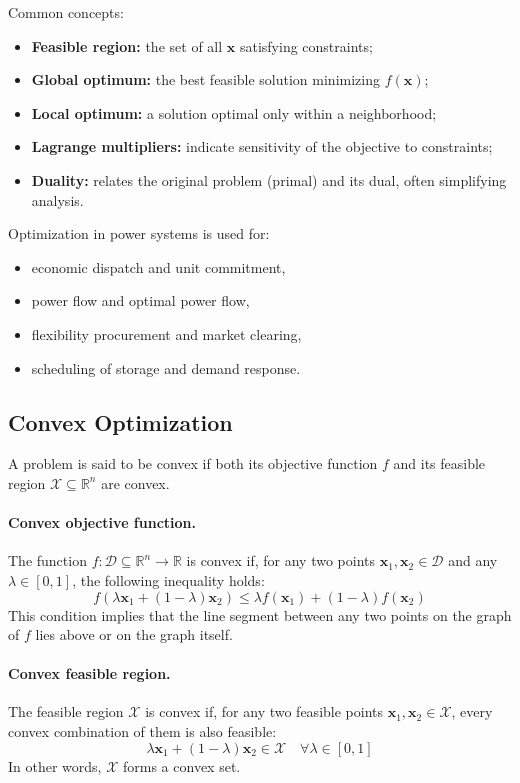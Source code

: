 \documentclass[11pt]{article}
\begin{document}
	Common concepts:
	\begin{itemize}
		\item \textbf{Feasible region:} the set of all $\mathbf{x}$ satisfying constraints;
		\item \textbf{Global optimum:} the best feasible solution minimizing $f(\mathbf{x})$;
		\item \textbf{Local optimum:} a solution optimal only within a neighborhood;
		\item \textbf{Lagrange multipliers:} indicate sensitivity of the objective to constraints;
		\item \textbf{Duality:} relates the original problem (primal) and its dual, often simplifying analysis.
	\end{itemize}
	
	Optimization in power systems is used for:
	\begin{itemize}
		\item economic dispatch and unit commitment,
		\item power flow and optimal power flow,
		\item flexibility procurement and market clearing,
		\item scheduling of storage and demand response.
	\end{itemize}
	
	\subsection{Convex Optimization}
	
	A problem is said to be convex if both its objective function $f$ and its feasible region $\mathcal{X}\subseteq\mathbb{R}^n$ are convex.
	
	\paragraph{Convex objective function.}
	The function $f:\mathcal{D}\subseteq\mathbb{R}^n\to\mathbb{R}$ is convex if, for any two points $\mathbf{x}_1, \mathbf{x}_2 \in \mathcal{D}$ and any $\lambda \in [0,1]$, the following inequality holds:
	\[
	f(\lambda \mathbf{x}_1 + (1-\lambda)\mathbf{x}_2) \le \lambda f(\mathbf{x}_1) + (1-\lambda)f(\mathbf{x}_2)
	\]
	This condition implies that the line segment between any two points on the graph of $f$ lies above or on the graph itself.
	
	\paragraph{Convex feasible region.}
	The feasible region $\mathcal{X}$ is convex if, for any two feasible points $\mathbf{x}_1, \mathbf{x}_2 \in \mathcal{X}$, every convex combination of them is also feasible:
	\[
	\lambda \mathbf{x}_1 + (1-\lambda)\mathbf{x}_2 \in \mathcal{X} \quad \forall \lambda \in [0,1]
	\]
	In other words, $\mathcal{X}$ forms a convex set.
	
\end{document}
